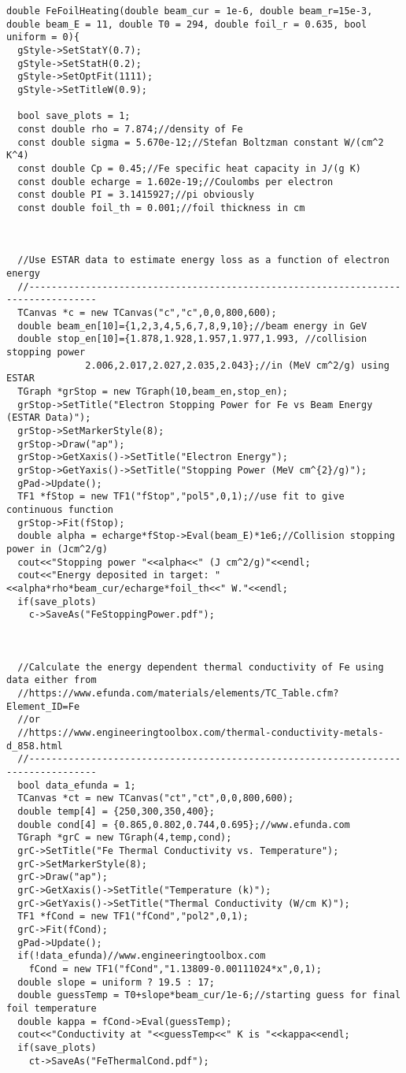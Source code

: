 \documentclass[12pt]{article}
\begin{document}
\begin{lstlisting}
double FeFoilHeating(double beam_cur = 1e-6, double beam_r=15e-3, double beam_E = 11, double T0 = 294, double foil_r = 0.635, bool uniform = 0){
  gStyle->SetStatY(0.7);
  gStyle->SetStatH(0.2);
  gStyle->SetOptFit(1111);
  gStyle->SetTitleW(0.9);

  bool save_plots = 1;
  const double rho = 7.874;//density of Fe
  const double sigma = 5.670e-12;//Stefan Boltzman constant W/(cm^2 K^4)
  const double Cp = 0.45;//Fe specific heat capacity in J/(g K)
  const double echarge = 1.602e-19;//Coulombs per electron
  const double PI = 3.1415927;//pi obviously
  const double foil_th = 0.001;//foil thickness in cm

  

  //Use ESTAR data to estimate energy loss as a function of electron energy
  //----------------------------------------------------------------------------------
  TCanvas *c = new TCanvas("c","c",0,0,800,600);
  double beam_en[10]={1,2,3,4,5,6,7,8,9,10};//beam energy in GeV
  double stop_en[10]={1.878,1.928,1.957,1.977,1.993, //collision stopping power 
		      2.006,2.017,2.027,2.035,2.043};//in (MeV cm^2/g) using ESTAR
  TGraph *grStop = new TGraph(10,beam_en,stop_en);
  grStop->SetTitle("Electron Stopping Power for Fe vs Beam Energy (ESTAR Data)");
  grStop->SetMarkerStyle(8);
  grStop->Draw("ap");
  grStop->GetXaxis()->SetTitle("Electron Energy");
  grStop->GetYaxis()->SetTitle("Stopping Power (MeV cm^{2}/g)");
  gPad->Update();
  TF1 *fStop = new TF1("fStop","pol5",0,1);//use fit to give continuous function
  grStop->Fit(fStop);  
  double alpha = echarge*fStop->Eval(beam_E)*1e6;//Collision stopping power in (Jcm^2/g)
  cout<<"Stopping power "<<alpha<<" (J cm^2/g)"<<endl;
  cout<<"Energy deposited in target: "<<alpha*rho*beam_cur/echarge*foil_th<<" W."<<endl;
  if(save_plots)
    c->SaveAs("FeStoppingPower.pdf");

  

  //Calculate the energy dependent thermal conductivity of Fe using data either from
  //https://www.efunda.com/materials/elements/TC_Table.cfm?Element_ID=Fe
  //or
  //https://www.engineeringtoolbox.com/thermal-conductivity-metals-d_858.html
  //----------------------------------------------------------------------------------
  bool data_efunda = 1;
  TCanvas *ct = new TCanvas("ct","ct",0,0,800,600);
  double temp[4] = {250,300,350,400};
  double cond[4] = {0.865,0.802,0.744,0.695};//www.efunda.com
  TGraph *grC = new TGraph(4,temp,cond);
  grC->SetTitle("Fe Thermal Conductivity vs. Temperature");
  grC->SetMarkerStyle(8);
  grC->Draw("ap");
  grC->GetXaxis()->SetTitle("Temperature (k)");
  grC->GetYaxis()->SetTitle("Thermal Conductivity (W/cm K)");
  TF1 *fCond = new TF1("fCond","pol2",0,1);
  grC->Fit(fCond);
  gPad->Update();
  if(!data_efunda)//www.engineeringtoolbox.com
    fCond = new TF1("fCond","1.13809-0.00111024*x",0,1);
  double slope = uniform ? 19.5 : 17;
  double guessTemp = T0+slope*beam_cur/1e-6;//starting guess for final foil temperature
  double kappa = fCond->Eval(guessTemp);
  cout<<"Conductivity at "<<guessTemp<<" K is "<<kappa<<endl;
  if(save_plots)
    ct->SaveAs("FeThermalCond.pdf");



\end{lstlisting}
\end{document}
